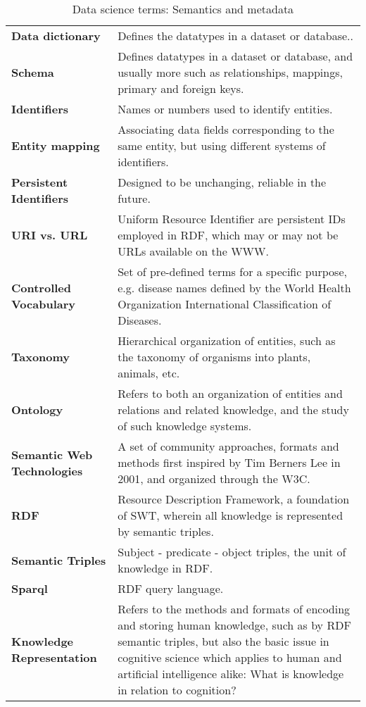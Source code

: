 \begin{appendices}
\begin{table}
\caption{Data science terms: Semantics and metadata}
\begin{tabular}{p{0.3\linewidth}p{0.7\linewidth}}
\hline
\textbf{Data dictionary} & Defines the datatypes in a dataset or database.. \\
\textbf{Schema} & Defines datatypes in a dataset or database, and usually more such as relationships, mappings, primary and foreign keys. \\
\textbf{Identifiers} & Names or numbers used to identify entities. \\
\textbf{Entity mapping} & Associating data fields corresponding to the same entity, but using different systems of identifiers. \\
\textbf{Persistent Identifiers} & Designed to be unchanging, reliable in the future. \\
\textbf{URI vs. URL} & Uniform Resource Identifier are persistent IDs employed in RDF, which may or may not be URLs available on the WWW. \\
\textbf{Controlled Vocabulary} & Set of pre-defined terms for a specific purpose, e.g. disease names defined by the World Health Organization International
Classification of Diseases. \\
\textbf{Taxonomy} & Hierarchical organization of entities, such as the taxonomy of organisms into plants, animals, etc. \\
\textbf{Ontology} & Refers to both an organization of entities and relations and related knowledge, and the study of such knowledge systems. \\
\textbf{Semantic Web Technologies} & A set of community approaches, formats and methods first inspired by Tim Berners Lee in 2001, and organized through the W3C. \\
\textbf{RDF} & Resource Description Framework, a foundation of SWT, wherein all knowledge is represented by semantic triples. \\
\textbf{Semantic Triples} & Subject - predicate - object triples, the unit of knowledge in RDF. \\
\textbf{Sparql} & RDF query language. \\
\textbf{Knowledge Representation} & Refers to the methods and formats of encoding and storing human knowledge, such as by RDF semantic triples, but also the basic
issue in cognitive science which applies to human and artificial intelligence alike: What is knowledge in relation to cognition? \\
\hline
\end{tabular}
\end{table}


\end{appendices}
